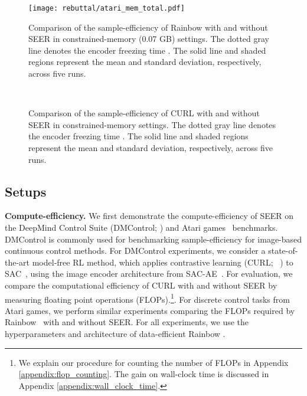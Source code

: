 \documentclass{article}
\begin{document}
\begin{figure*} [ht] \centering
\texttt{[image: rebuttal/atari\_mem\_total.pdf]}
\caption{Comparison of the sample-efficiency of Rainbow with and without SEER in constrained-memory (0.07 GB) settings. The dotted gray line denotes the encoder freezing time . The solid line and shaded regions represent the mean and standard deviation, respectively, across five runs.} \label{fig:memory_atari}
\vspace{-0.1in}
\end{figure*}

\begin{figure*} [t] \centering
{} 
\\
\caption{Comparison of the sample-efficiency of CURL with and without SEER in constrained-memory settings. The dotted gray line denotes the encoder freezing time . The solid line and shaded regions represent the mean and standard deviation, respectively, across five runs.} \label{fig:memory_dmc}
\vspace{-0.1in}
\end{figure*}

\subsection{Setups} \label{setups}

\textbf{Compute-efficiency.} 
We first demonstrate the compute-efficiency of SEER on the DeepMind Control Suite (DMControl; \citealt{tassa2018deepmind}) and Atari games~\citep{bellemare2013arcade} benchmarks.
DMControl is commonly used for benchmarking sample-efficiency for image-based continuous control methods.
For DMControl experiments,
we consider a state-of-the-art model-free RL method, which applies contrastive learning (CURL; ~\citealt{srinivas2020curl}) to SAC~\citep{haarnoja2018soft}, using the image encoder architecture from
SAC-AE~\citep{yarats2019improving}.
For evaluation,
we compare the computational efficiency of CURL with and without SEER by measuring floating point operations (FLOPs).\footnote{
We explain our procedure for counting the number of FLOPs in Appendix \ref{appendix:flop_counting}. 
The gain on wall-clock time is discussed in Appendix \ref{appendix:wall_clock_time}.}.
For discrete control tasks from Atari games,
we perform similar experiments comparing the FLOPs required by Rainbow~\citep{hessel2018rainbow} with and without SEER. For all experiments, we use the hyperparameters and architecture of data-efficient Rainbow \citep{van2019use}. 
\end{document}
